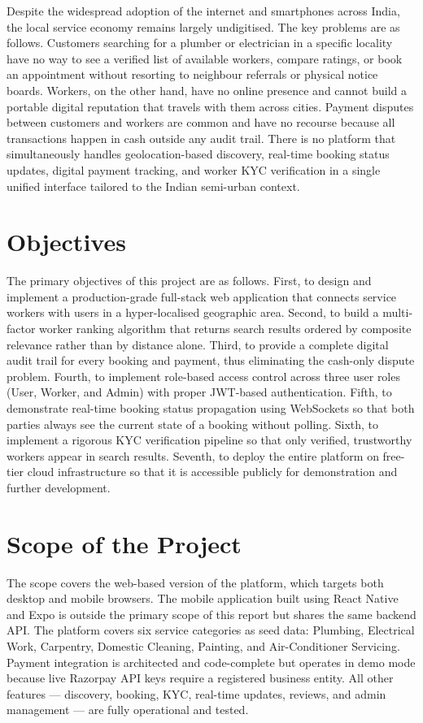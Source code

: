 \documentclass[12pt,a4paper]{report}
\begin{document}
Despite the widespread adoption of the internet and smartphones across India, the local service economy remains largely undigitised. The key problems are as follows. Customers searching for a plumber or electrician in a specific locality have no way to see a verified list of available workers, compare ratings, or book an appointment without resorting to neighbour referrals or physical notice boards. Workers, on the other hand, have no online presence and cannot build a portable digital reputation that travels with them across cities. Payment disputes between customers and workers are common and have no recourse because all transactions happen in cash outside any audit trail. There is no platform that simultaneously handles geolocation-based discovery, real-time booking status updates, digital payment tracking, and worker KYC verification in a single unified interface tailored to the Indian semi-urban context.

\section{Objectives}

The primary objectives of this project are as follows. First, to design and implement a production-grade full-stack web application that connects service workers with users in a hyper-localised geographic area. Second, to build a multi-factor worker ranking algorithm that returns search results ordered by composite relevance rather than by distance alone. Third, to provide a complete digital audit trail for every booking and payment, thus eliminating the cash-only dispute problem. Fourth, to implement role-based access control across three user roles (User, Worker, and Admin) with proper JWT-based authentication. Fifth, to demonstrate real-time booking status propagation using WebSockets so that both parties always see the current state of a booking without polling. Sixth, to implement a rigorous KYC verification pipeline so that only verified, trustworthy workers appear in search results. Seventh, to deploy the entire platform on free-tier cloud infrastructure so that it is accessible publicly for demonstration and further development.

\section{Scope of the Project}

The scope covers the web-based version of the platform, which targets both desktop and mobile browsers. The mobile application built using React Native and Expo is outside the primary scope of this report but shares the same backend API. The platform covers six service categories as seed data: Plumbing, Electrical Work, Carpentry, Domestic Cleaning, Painting, and Air-Conditioner Servicing. Payment integration is architected and code-complete but operates in demo mode because live Razorpay API keys require a registered business entity. All other features — discovery, booking, KYC, real-time updates, reviews, and admin management — are fully operational and tested.
\end{document}
